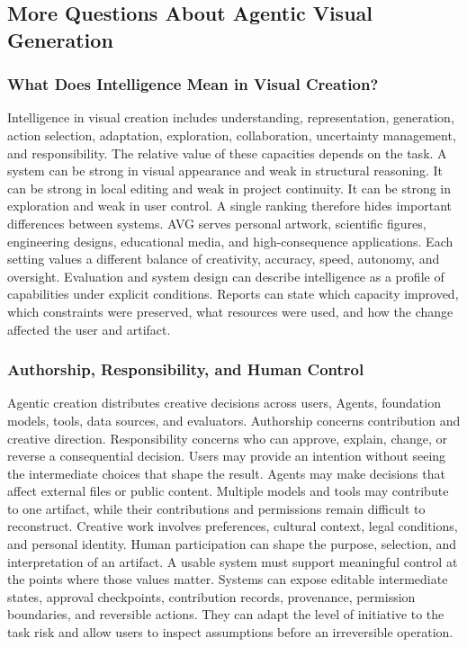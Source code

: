 \subsection{More Questions About Agentic Visual Generation}

\subsubsection{What Does Intelligence Mean in Visual Creation?}

Intelligence in visual creation includes understanding, representation, generation, action selection, adaptation, exploration, collaboration, uncertainty management, and responsibility. The relative value of these capacities depends on the task. A system can be strong in visual appearance and weak in structural reasoning. It can be strong in local editing and weak in project continuity. It can be strong in exploration and weak in user control. A single ranking therefore hides important differences between systems. AVG serves personal artwork, scientific figures, engineering designs, educational media, and high-consequence applications. Each setting values a different balance of creativity, accuracy, speed, autonomy, and oversight. Evaluation and system design can describe intelligence as a profile of capabilities under explicit conditions. Reports can state which capacity improved, which constraints were preserved, what resources were used, and how the change affected the user and artifact.


\subsubsection{Authorship, Responsibility, and Human Control}

Agentic creation distributes creative decisions across users, Agents, foundation models, tools, data sources, and evaluators. Authorship concerns contribution and creative direction. Responsibility concerns who can approve, explain, change, or reverse a consequential decision. Users may provide an intention without seeing the intermediate choices that shape the result. Agents may make decisions that affect external files or public content. Multiple models and tools may contribute to one artifact, while their contributions and permissions remain difficult to reconstruct. Creative work involves preferences, cultural context, legal conditions, and personal identity. Human participation can shape the purpose, selection, and interpretation of an artifact. A usable system must support meaningful control at the points where those values matter. Systems can expose editable intermediate states, approval checkpoints, contribution records, provenance, permission boundaries, and reversible actions. They can adapt the level of initiative to the task risk and allow users to inspect assumptions before an irreversible operation.


